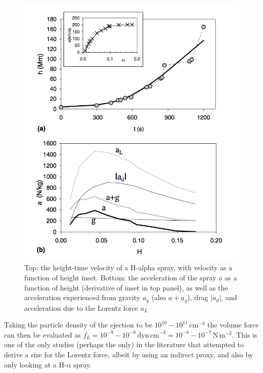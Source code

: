 \begin{figure}[ts!]
\begin{center}
\includegraphics[scale=0.4, trim=0cm 0cm 0cm 2cm]{images/vrsnak_lorentz}
\caption[Acceleration due to all forces acting on CME]{Top: the height-time velocity of a H-alpha spray, with velocity as a function of height inset. Bottom: the acceleration of the spray $a$ as a function of height (derivative of inset in top panel), as well as the acceleration experienced from gravity $a_g$ (also $a+a_g$), drag $|a_d|$, and acceleration due to the Lorentz force $a_L$ \citep{vrs06}}
\label{fig:vrsnak06}
\end{center}
\end{figure}
Taking the particle density of the ejection to be $10^{10}-10^{11}$\,cm$^{-3}$ the volume force can then be evaluated as $f_L = 10^{-9} - 10^{-8}\,\mathrm{dyn\,cm}^{-3} = 10^{-8}-10^{-7}$\,N\,m$^{-3}$. This is one of the only studies (perhaps the only) in the literature that attempted to derive a size for the Lorentz force, albeit by using an indirect proxy, and also by only looking at a H-$\alpha$ spray. 

